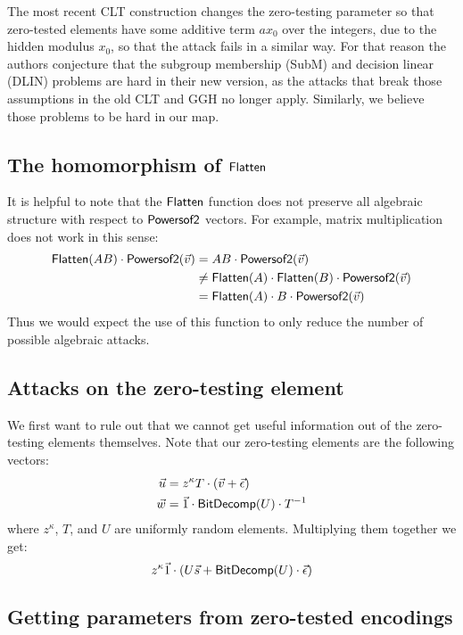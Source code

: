 The most recent CLT construction \cite{clt15} changes the zero-testing parameter so that zero-tested elements have some additive term $ax_0$ over the integers, due to the hidden modulus $x_0$, so that the attack fails in a similar way.  For that reason the authors conjecture that the subgroup membership (SubM) and decision linear (DLIN) problems are hard in their new version, as the attacks that break those assumptions in the old CLT and GGH no longer apply.  Similarly, we believe those problems to be hard in our map.

\subsection{The homomorphism of $\mathsf{Flatten}$}

It is helpful to note that the $\mathsf{Flatten}$ function does not preserve all algebraic structure with respect to $\mathsf{Powersof2}$ vectors.  For example, matrix multiplication does not work in this sense:
\begin{align*}
\mathsf{Flatten}(AB)\cdot \mathsf{Powersof2}(\vec{v}) &= AB \cdot \mathsf{Powersof2}(\vec{v})\\
&\not= \mathsf{Flatten}(A)\cdot \mathsf{Flatten}(B)\cdot \mathsf{Powersof2}(\vec{v})\\ 
&= \mathsf{Flatten}(A)\cdot B\cdot \mathsf{Powersof2}(\vec{v})
\end{align*}
Thus we would expect the use of this function to only reduce the number of possible algebraic attacks.

\subsection{Attacks on the zero-testing element}

We first want to rule out that we cannot get useful information out of the zero-testing elements themselves.  Note that our zero-testing elements are the following vectors:
\begin{align*}
\vec{u} &= z^\kappa T\cdot (\vec{v} + \vec{\epsilon})\\
\vec{w} &= \vec{1}\cdot\mathsf{BitDecomp}(U)\cdot T^{-1}
\end{align*}
where $z^\kappa$, $T$, and $U$ are uniformly random elements.  Multiplying them together we get:
$$z^\kappa \vec{1}\cdot (U\vec{s} + \mathsf{BitDecomp}(U)\cdot\vec{\epsilon})$$

\subsection{Getting parameters from zero-tested encodings}

